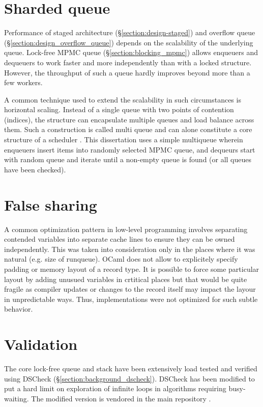 \documentclass[12pt,a4paper,twoside]{report}
\begin{document}
\section{Sharded queue}
\label{section:multiqueue_details}

Performance of staged architecture (\S\ref{section:design-staged}) and overflow queue (\S\ref{section:design_overflow_queue}) depends on the scalability of the underlying queue. Lock-free MPMC queue (\S\ref{section:blocking_mpmc}) allows enqueuers and dequeuers to work faster and more independently than with a locked structure. However, the throughput of such a queue hardly improves beyond more than a few workers.  

A common technique used to extend the scalability in such circumstances is horizontal scaling. Instead of a single queue with two points of contention (indices), the structure can encapsulate multiple queues and load balance across them. Such a construction is called multi queue and can alone constitute a core structure of a scheduler \cite{Postnikova2022}. This dissertation uses a simple multiqueue wherein enqueuers insert items into randomly selected MPMC queue, and dequeurs start with random queue and iterate until a non-empty queue is found (or all queues have been checked).

\section{False sharing}
A common optimization pattern in low-level programming involves separating contended variables into separate cache lines to ensure they can be owned independently. This was taken into consideration only in the places where it was natural (e.g. size of runqueue). OCaml does not allow to explicitely specify padding or memory layout of a record type. It is possible to force some particular layout by adding unusued variables in crtitical places but that would be quite fragile as compiler updates or changes to the record itself may impact the layour in unpredictable ways. Thus, implementations were not optimized for such subtle behavior. 

\section{Validation}

The core lock-free queue and stack have been extensively load tested and verified using DSCheck (\S\ref{section:background_dscheck}). DSCheck has been modified to put a hard limit on exploration of infinite loops in algorithms requiring busy-waiting. The modified version is vendored in the main repository \cite{bartoszm90:online}.
\end{document}
